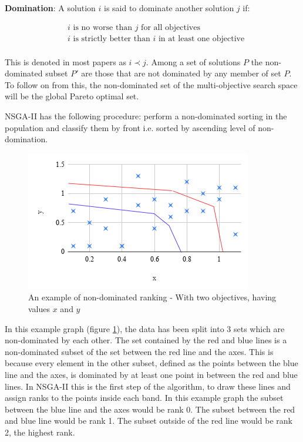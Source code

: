 \documentclass[11pt]{article}
\begin{document}
    \textbf{Domination}: A solution \(i\) is said to dominate another solution \(j\) if:

    \begin{align*}
        & i \text{ is no worse than } j \text{ for all objectives} \\
        & i \text{ is strictly better than } i \text{ in at least one objective} \\
    \end{align*}

    This is denoted in most papers as \(i \prec j\). Among a set of solutions \(P\)
    the non-dominated subset \(P'\) are those that are not dominated by any member of
    set \(P\). To follow on from this, the non-dominated set of the multi-objective search
    space will be the global Pareto optimal set.

    NSGA-II has the following procedure: perform a non-dominated sorting in the population
    and classify them by front i.e. sorted by ascending level of non-domination.

    \begin{figure}[H]
        \centering
        \includegraphics[width=.6\textwidth]{NSGArank}
        \caption{An example of non-dominated ranking - With two objectives, having values \(x\) and \(y\)}\label{fig:NSGArank}
    \end{figure}
    In this example graph (figure \ref{fig:NSGArank}), the data has been split into 3 sets
    which are non-dominated
    by each other. The set contained by the red and blue lines is a non-dominated subset
    of the set between the red line and the axes. This is because every element in the other subset, defined
    as the points between the blue line and the axes, is dominated by at least one point in between
    the red and blue lines. In NSGA-II this is the first step of the algorithm, to draw these lines
    and assign ranks to the points inside each band. In this example graph the subset between the
    blue line and the axes would be rank 0. The subset between the red and blue line would be rank
    1. The subset outside of the red line would be rank 2, the highest rank.
\end{document}
